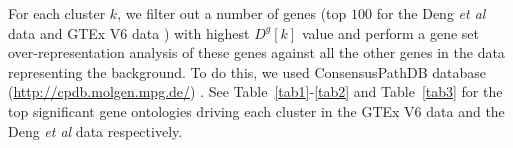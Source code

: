 \documentclass[10pt,letterpaper]{article}
\begin{document}
For each cluster $k$, we filter out a number of genes (top $100$ for the Deng \textit{et al} data \cite{Deng2014} and GTEx V6 data \cite{GTEX2013}) with highest $D^{g}[k]$ value and perform a gene set over-representation analysis of these genes against all the other genes in the data representing the background. To do this, we used ConsensusPathDB database (\url{http://cpdb.molgen.mpg.de/})  \cite{Kamburov2013} \cite{Pentchev2010}. See Table~\ref{tab1}-\ref{tab2} and Table~\ref{tab3} for the top significant gene ontologies driving each cluster in the GTEx V6 data and the Deng \textit{et al} data respectively.


\end{document}
